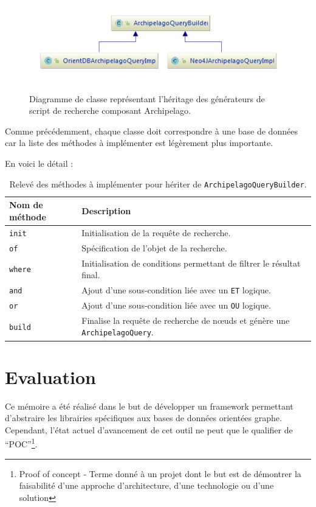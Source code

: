 \documentclass[a4paper,fleqn,12pt,oneside]{book}
\begin{document}
\begin{figure}[!ht]
\centering
\includegraphics[scale=1.5]{figures/queryBuilders.png}
\label{fig:QueryBuilders}
\caption{Diagramme de classe représentant l'héritage des générateurs de script de recherche composant Archipelago.}
\end{figure}

Comme précédemment, chaque classe doit correspondre à une base de données car la liste des méthodes à implémenter est légèrement plus importante.

En voici le détail :
\begin{table}[ht!]
\centering
\begin{tabular}[c]{|l|M{12cm}|}

\hline
\textbf{Nom de méthode} & \textbf{Description}  \tabularnewline
\hline
\texttt{init} & Initialisation de la requête de recherche.  \tabularnewline
\hline
\texttt{of} & Spécification de l'objet de la recherche.  \tabularnewline
\hline
\texttt{where} & Initialisation de conditions permettant de filtrer le résultat final.  \tabularnewline
\hline
\texttt{and} & Ajout d'une sous-condition liée avec un \texttt{ET} logique. \tabularnewline
\hline
\texttt{or} & Ajout d'une sous-condition liée avec un \texttt{OU} logique.   \tabularnewline
\hline
\texttt{build} & Finalise la requête de recherche de nœuds et génère une \texttt{ArchipelagoQuery}.   \tabularnewline \hline

\end{tabular}
\caption{Relevé des méthodes à implémenter pour hériter de \texttt{ArchipelagoQueryBuilder}.}
\label{tab:ArchipelagoQueryBuilder}
\end{table}


\chapter{Evaluation}

Ce mémoire a été réalisé dans le but de développer un framework permettant d'abstraire les librairies spécifiques aux bases de données orientées graphe. Cependant, l'état actuel d'avancement de cet outil ne peut que le qualifier de \enquote{POC}\footnote{Proof of concept - Terme donné à un projet dont le but est de démontrer la faisabilité d'une approche d'architecture, d'une technologie ou d'une solution }.
\end{document}
